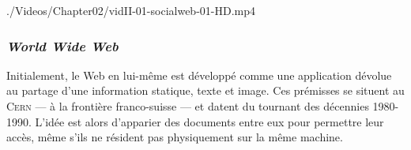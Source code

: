 \begin{marginvideo}
	[\label{vid:II.1}Web sociétal I.]%
		{./Videos/Chapter02/vidII-01-socialweb-01-HD.mp4}%
\end{marginvideo}


\subsubsection[\textit{World Wide Web}]{\textit{World Wide Web}}
\label{subsub:II.1.1.1}

Initialement, le Web en lui-même est développé comme une application dévolue au partage d'une information statique, texte et image. Ces prémisses se situent au \textsc{Cern} --- à la frontière franco-suisse --- et datent du tournant des décennies 1980-1990. L'idée est alors d'apparier des documents entre eux pour permettre leur accès, même s'ils ne résident pas physiquement sur la même machine. 

